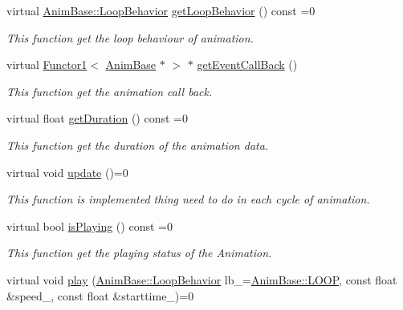 \begin{DoxyCompactItemize}
virtual \hyperlink{class_i_dream_sky_1_1_anim_base_aac1c8b7253df068cf02101dcd4f586e2}{Anim\+Base\+::\+Loop\+Behavior} \hyperlink{class_i_dream_sky_1_1_anim_base_a49befda4d29f8d5321a15b58c53b934f}{get\+Loop\+Behavior} () const  =0
\begin{DoxyCompactList}\small\item\em This function get the loop behaviour of animation. \end{DoxyCompactList}\item 
virtual \hyperlink{class_i_dream_sky_1_1_functor1}{Functor1}$<$ \hyperlink{class_i_dream_sky_1_1_anim_base}{Anim\+Base} $\ast$ $>$ $\ast$ \hyperlink{class_i_dream_sky_1_1_anim_base_a6a88e915f45ecc7e081f2dec0cec00b9}{get\+Event\+Call\+Back} ()
\begin{DoxyCompactList}\small\item\em This function get the animation call back. \end{DoxyCompactList}\item 
virtual float \hyperlink{class_i_dream_sky_1_1_anim_base_a7fdd02473fb412e79562f5b0535e7ec8}{get\+Duration} () const  =0
\begin{DoxyCompactList}\small\item\em This function get the duration of the animation data. \end{DoxyCompactList}\item 
virtual void \hyperlink{class_i_dream_sky_1_1_anim_base_a10fac6c2bffe298a8758ddb142588737}{update} ()=0
\begin{DoxyCompactList}\small\item\em This function is implemented thing need to do in each cycle of animation. \end{DoxyCompactList}\item 
virtual bool \hyperlink{class_i_dream_sky_1_1_anim_base_a055c9b1b5984709bc8659566a084365c}{is\+Playing} () const  =0
\begin{DoxyCompactList}\small\item\em This function get the playing status of the Animation. \end{DoxyCompactList}\item 
virtual void \hyperlink{class_i_dream_sky_1_1_anim_base_af3a714ac01e1e1f0ba0abbcfbd4f4444}{play} (\hyperlink{class_i_dream_sky_1_1_anim_base_aac1c8b7253df068cf02101dcd4f586e2}{Anim\+Base\+::\+Loop\+Behavior} lb\+\_\+=\hyperlink{class_i_dream_sky_1_1_anim_base_aac1c8b7253df068cf02101dcd4f586e2aa119a43717e821f2708795bd94021ea1}{Anim\+Base\+::\+L\+O\+OP}, const float \&speed\+\_, const float \&starttime\+\_)=0

\end{DoxyCompactItemize}
